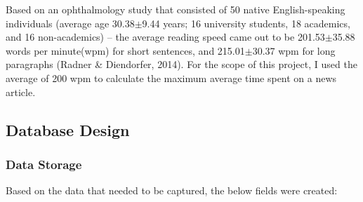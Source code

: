 \documentclass[12pt]{article}
\begin{document}
\noindent Based on an ophthalmology study that consisted of 50 native English-speaking individuals (average age 30.38$\pm$9.44 years; 16 university students, 18 academics, and 16 non-academics) -- the average reading speed came out to be 201.53$\pm$35.88 words per minute(wpm) for short sentences, and 215.01$\pm$30.37 wpm for long paragraphs (Radner \& Diendorfer, 2014). For the scope of this project, I used the average of 200 wpm to calculate the maximum average time spent on a news article.  

\vfill

\subsection{Database Design}
\subsubsection{Data Storage}
Based on the data that needed to be captured, the below fields were created:
\end{document}
